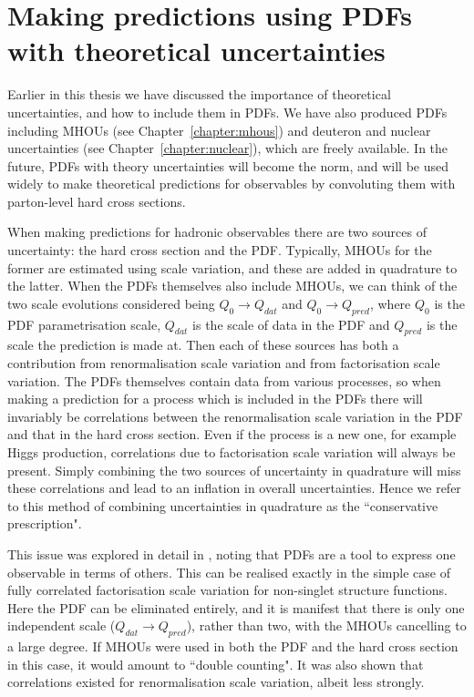 \chapter{Making predictions using PDFs with theoretical uncertainties}
\label{chapter:correlations}
Earlier in this thesis we have discussed the importance of theoretical uncertainties, and how to include them in PDFs. We have also produced PDFs including MHOUs (see Chapter~\ref{chapter:mhous}) and deuteron and nuclear uncertainties (see Chapter~\ref{chapter:nuclear}), which are freely available. In the future, PDFs with theory uncertainties will become the norm, and will be used widely to make theoretical predictions for observables by convoluting them with parton-level hard cross sections. 

When making predictions for hadronic observables there are two sources of uncertainty: the hard cross section and the PDF. Typically, MHOUs for the former are estimated using scale variation, and these are added in quadrature to the latter. When the PDFs themselves also include MHOUs, we can think of the two scale evolutions considered being $Q_0 \to Q_{dat}$ and $Q_0 \to Q_{pred}$, where $Q_0$ is the PDF parametrisation scale, $Q_{dat}$ is the scale of data in the PDF and $Q_{pred}$ is the scale the prediction is made at. Then each of these sources has both a contribution from renormalisation scale variation and from factorisation scale variation.  The PDFs themselves contain data from various processes, so when making a prediction for a process which is included in the PDFs there will invariably be correlations between the renormalisation scale variation in the PDF and that in the hard cross section. Even if the process is a new one, for example Higgs production, correlations due to factorisation scale variation will always be present. Simply combining the two sources of uncertainty in quadrature will miss these correlations and lead to an inflation in overall uncertainties. Hence we refer to this method of combining uncertainties in quadrature as the ``conservative prescription".

This issue was explored in detail in \cite{Harland-Lang:2018bxd}, noting that PDFs are a tool to express one observable in terms of others. This can be realised exactly in the simple case of fully correlated factorisation scale variation for non-singlet structure functions. Here the PDF can be eliminated entirely, and it is manifest that there is only one independent scale ($Q_{dat} \to Q_{pred}$), rather than two, with the MHOUs cancelling to a large degree. If MHOUs were used in both the PDF and the hard cross section in this case, it would amount to ``double counting". It was also shown that correlations existed for renormalisation scale variation, albeit less strongly.

